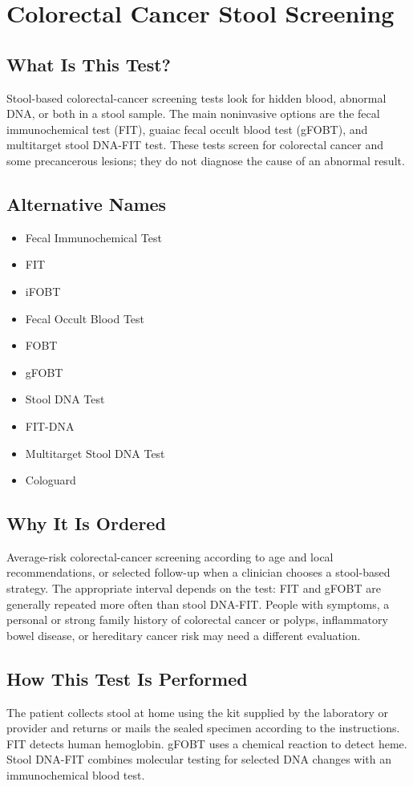\chapter{Colorectal Cancer Stool Screening}

\section*{What Is This Test?}
Stool-based colorectal-cancer screening tests look for hidden blood, abnormal DNA, or both in a stool sample. The main noninvasive options are the fecal immunochemical test (FIT), guaiac fecal occult blood test (gFOBT), and multitarget stool DNA-FIT test. These tests screen for colorectal cancer and some precancerous lesions; they do not diagnose the cause of an abnormal result.

\section*{Alternative Names}
\begin{itemize}
  \item Fecal Immunochemical Test
  \item FIT
  \item iFOBT
  \item Fecal Occult Blood Test
  \item FOBT
  \item gFOBT
  \item Stool DNA Test
  \item FIT-DNA
  \item Multitarget Stool DNA Test
  \item Cologuard
\end{itemize}
\section*{Why It Is Ordered}
Average-risk colorectal-cancer screening according to age and local recommendations, or selected follow-up when a clinician chooses a stool-based strategy. The appropriate interval depends on the test: FIT and gFOBT are generally repeated more often than stool DNA-FIT. People with symptoms, a personal or strong family history of colorectal cancer or polyps, inflammatory bowel disease, or hereditary cancer risk may need a different evaluation.

\section*{How This Test Is Performed}
The patient collects stool at home using the kit supplied by the laboratory or provider and returns or mails the sealed specimen according to the instructions. FIT detects human hemoglobin. gFOBT uses a chemical reaction to detect heme. Stool DNA-FIT combines molecular testing for selected DNA changes with an immunochemical blood test.

